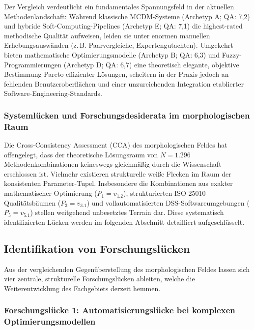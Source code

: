 Der Vergleich verdeutlicht ein fundamentales Spannungsfeld in der aktuellen Methodenlandschaft: Während klassische MCDM-Systeme (Archetyp A; QA: 7,2) und hybride Soft-Computing-Pipelines (Archetyp E; QA: 7,1) die highest-rated methodische Qualität aufweisen, leiden sie unter enormen manuellen Erhebungsauswänden (z.\,B. Paarvergleiche, Expertengutachten). Umgekehrt bieten mathematische Optimierungsmodelle (Archetyp B; QA: 6,3) und Fuzzy-Programmierungen (Archetyp D; QA: 6,7) eine theoretisch elegante, objektive Bestimmung Pareto-effizienter Lösungen, scheitern in der Praxis jedoch an fehlenden Benutzeroberflächen und einer unzureichenden Integration etablierter Software-Engineering-Standards.

\subsubsection{Systemlücken und Forschungsdesiderata im morphologischen Raum}

Die Cross-Consistency Assessment (CCA) des morphologischen Feldes hat offengelegt, dass der theoretische Lösungsraum von $N = 1.296$ Methodenkombinationen keineswegs gleichmäßig durch die Wissenschaft erschlossen ist. Vielmehr existieren strukturelle weiße Flecken im Raum der konsistenten Parameter-Tupel. Insbesondere die Kombinationen aus exakter mathematischer Optimierung ($P_1 = v_{1.2}$), strukturierten ISO-25010-Qualitätsbäumen ($P_3 = v_{3.1}$) und vollautomatisierten DSS-Softwareumgebungen ($P_5 = v_{5.1}$) stellen weitgehend unbesetztes Terrain dar. Diese systematisch identifizierten Lücken werden im folgenden Abschnitt detailliert aufgeschlüsselt.

\subsection{Identifikation von Forschungslücken}
\label{subsec:forschungsluecken}

Aus der vergleichenden Gegenüberstellung des morphologischen Feldes lassen sich vier zentrale, strukturelle Forschungslücken ableiten, welche die Weiterentwicklung des Fachgebiets derzeit hemmen.

\subsubsection{Forschungslücke 1: Automatisierungslücke bei komplexen Optimierungsmodellen}

